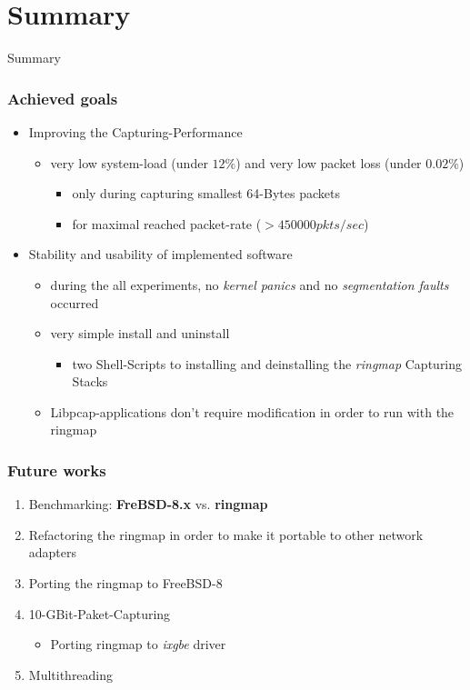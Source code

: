 \documentclass{beamer}
\begin{document}
\section{Summary}
\begin{frame}
	\begin{center}
	\huge{Summary}
	\end{center}
\end{frame}
\begin{frame}
\frametitle{Achieved goals}
\begin{itemize}
	\item Improving the Capturing-Performance
		\begin{itemize}
			\item very low  system-load (under $12\%$) and very low
				packet loss  (under  $0.02\%$)
				\begin{itemize}
					\item only during capturing smallest  64-Bytes packets
					\item for maximal reached packet-rate ($ > 450000 pkts/sec$) \newline
				\end{itemize}
		\end{itemize}
	\item Stability and usability of implemented software
		\begin{itemize}
			\item during the all experiments, no \emph{kernel panics} and no \emph{segmentation faults} occurred
			\item very simple install and uninstall
				\begin{itemize}
					\item two Shell-Scripts to installing  and deinstalling the   
						\emph{ringmap} Capturing Stacks
				\end{itemize}
			\item Libpcap-applications don't require modification in order to run with the ringmap
		\end{itemize}
\end{itemize}
\end{frame}

\begin{frame}
\frametitle{Future works}
\begin{enumerate}
	\item Benchmarking:  \textbf{FreBSD-8.x} vs. \textbf{ringmap}
	\item Refactoring the ringmap in order to make it portable to other network adapters
	\item Porting the ringmap to FreeBSD-8
	\item 10-GBit-Paket-Capturing
		\begin{itemize}
			\item Porting ringmap to \emph{ixgbe} driver
		\end{itemize}
	\item Multithreading
\end{enumerate}
\end{frame}
\end{document}
